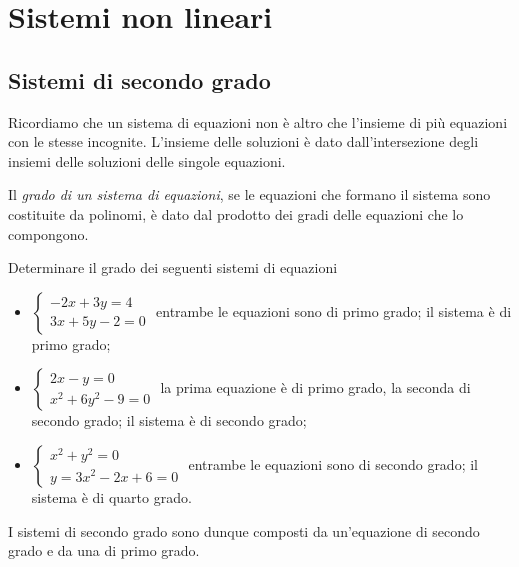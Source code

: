 \chapter{Sistemi non lineari}
\section{Sistemi di secondo grado}
Ricordiamo che un sistema di equazioni non è altro che l'insieme di più equazioni con le stesse incognite. L'insieme delle soluzioni è dato dall'intersezione degli insiemi delle soluzioni delle singole equazioni.

\begin{definizione}
Il \emph{grado di un sistema di equazioni}, se le equazioni che formano il sistema sono costituite da polinomi, è dato dal prodotto dei gradi delle equazioni che lo compongono.
\end{definizione}

\begin{exrig}
\begin{esempio}
Determinare il grado dei seguenti sistemi di equazioni

\begin{itemize}
\item \(\left\{\begin{array}{l}-2x+3y=4 \\3x+5y-2=0\end{array}\right.\) entrambe le equazioni sono di primo grado; il sistema è di primo grado;
\item \(\left\{\begin{array}{l}2x-y=0 \\x^2+6y^2-9=0\end{array}\right.\) la prima equazione è di primo grado, la seconda di secondo grado; il sistema è di secondo grado;
\item \(\left\{\begin{array}{l}x^2+y^2=0 \\y=3x^2-2x+6=0\end{array}\right.\) entrambe le equazioni sono di secondo grado; il sistema è di quarto grado.
\end{itemize}
\end{esempio}
\end{exrig}
I sistemi di secondo grado sono dunque composti da un'equazione di secondo grado e da una di primo grado.

